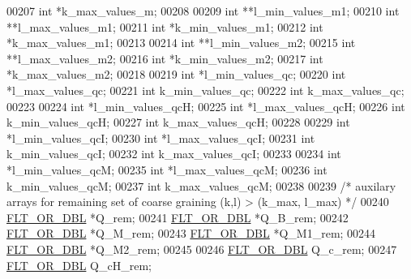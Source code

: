 \begin{DoxyCode}
00207   \textcolor{keywordtype}{int}             *k\_max\_values\_m;
00208 
00209   \textcolor{keywordtype}{int}             **l\_min\_values\_m1;
00210   \textcolor{keywordtype}{int}             **l\_max\_values\_m1;
00211   \textcolor{keywordtype}{int}             *k\_min\_values\_m1;
00212   \textcolor{keywordtype}{int}             *k\_max\_values\_m1;
00213 
00214   \textcolor{keywordtype}{int}             **l\_min\_values\_m2;
00215   \textcolor{keywordtype}{int}             **l\_max\_values\_m2;
00216   \textcolor{keywordtype}{int}             *k\_min\_values\_m2;
00217   \textcolor{keywordtype}{int}             *k\_max\_values\_m2;
00218 
00219   \textcolor{keywordtype}{int}             *l\_min\_values\_qc;
00220   \textcolor{keywordtype}{int}             *l\_max\_values\_qc;
00221   \textcolor{keywordtype}{int}             k\_min\_values\_qc;
00222   \textcolor{keywordtype}{int}             k\_max\_values\_qc;
00223 
00224   \textcolor{keywordtype}{int}             *l\_min\_values\_qcH;
00225   \textcolor{keywordtype}{int}             *l\_max\_values\_qcH;
00226   \textcolor{keywordtype}{int}             k\_min\_values\_qcH;
00227   \textcolor{keywordtype}{int}             k\_max\_values\_qcH;
00228 
00229   \textcolor{keywordtype}{int}             *l\_min\_values\_qcI;
00230   \textcolor{keywordtype}{int}             *l\_max\_values\_qcI;
00231   \textcolor{keywordtype}{int}             k\_min\_values\_qcI;
00232   \textcolor{keywordtype}{int}             k\_max\_values\_qcI;
00233 
00234   \textcolor{keywordtype}{int}             *l\_min\_values\_qcM;
00235   \textcolor{keywordtype}{int}             *l\_max\_values\_qcM;
00236   \textcolor{keywordtype}{int}             k\_min\_values\_qcM;
00237   \textcolor{keywordtype}{int}             k\_max\_values\_qcM;
00238 
00239   \textcolor{comment}{/* auxilary arrays for remaining set of coarse graining (k,l) > (k\_max, l\_max) */}
00240   \hyperlink{group__data__structures_ga31125aeace516926bf7f251f759b6126}{FLT\_OR\_DBL}      *Q\_rem;
00241   \hyperlink{group__data__structures_ga31125aeace516926bf7f251f759b6126}{FLT\_OR\_DBL}      *Q\_B\_rem;
00242   \hyperlink{group__data__structures_ga31125aeace516926bf7f251f759b6126}{FLT\_OR\_DBL}      *Q\_M\_rem;
00243   \hyperlink{group__data__structures_ga31125aeace516926bf7f251f759b6126}{FLT\_OR\_DBL}      *Q\_M1\_rem;
00244   \hyperlink{group__data__structures_ga31125aeace516926bf7f251f759b6126}{FLT\_OR\_DBL}      *Q\_M2\_rem;
00245 
00246   \hyperlink{group__data__structures_ga31125aeace516926bf7f251f759b6126}{FLT\_OR\_DBL}      Q\_c\_rem;
00247   \hyperlink{group__data__structures_ga31125aeace516926bf7f251f759b6126}{FLT\_OR\_DBL}      Q\_cH\_rem;

\end{DoxyCode}
